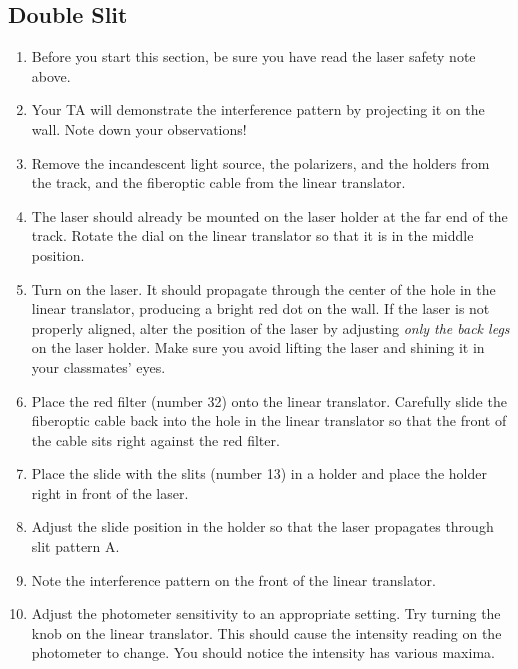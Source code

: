\subsection{Double Slit}
\begin{enumerate}
\item Before you start this section, be sure you have read the laser safety note above.

\item Your TA will demonstrate the interference pattern by projecting it on the wall. Note down your observations!

\item Remove the incandescent light source, the polarizers, and the holders from the track, and the fiberoptic cable from the linear translator.

\item The laser should already be mounted on the laser holder at the far end of the track. Rotate the dial on the linear translator so that it is in the middle position.

\item Turn on the laser. It should propagate through the center of the hole in the linear translator, producing a bright red dot on the wall. If the laser is not properly aligned, alter the position of the laser by adjusting \emph{only the back legs} on the laser holder. Make sure you avoid lifting the laser and shining it in your classmates' eyes.

\item Place the red filter (number 32) onto the linear translator. Carefully slide the fiberoptic cable back into the hole in the linear translator so that the front of the cable sits right against the red filter.

\item Place the slide with the slits (number 13) in a holder and place the holder right in front of the laser.

\item Adjust the slide position in the holder so that the laser propagates through slit pattern A.

\item Note the interference pattern on the front of the linear translator.

\item Adjust the photometer sensitivity to an appropriate setting. Try turning the knob on the linear translator. This should cause the intensity reading on the photometer to change. You should notice the intensity has various maxima.


\end{enumerate}
